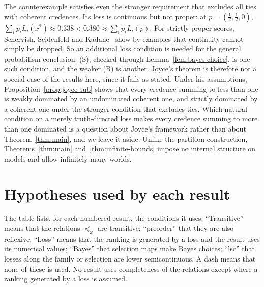 \documentclass[11pt]{article}
\theoremstyle{definition}
\theoremstyle{remark}
\begin{document}
The counterexample satisfies even the stronger requirement that excludes all ties with coherent credences. Its loss is continuous but not proper: at $p=(\tfrac12,\tfrac12,0)$, $\sum_ip_iL_i(x^*)\approx0.338<0.380\approx\sum_ip_iL_i(p)$. For strictly proper scores, Schervish, Seidenfeld and Kadane~\cite{SSK09} show by examples that continuity cannot simply be dropped. So an additional loss condition is needed for the general probabilism conclusion; (S), checked through Lemma~\ref{lem:bayes-choice}, is one such condition, and the weaker (B) is another. Joyce's theorem is therefore not a special case of the results here, since it fails as stated. Under his assumptions, Proposition~\ref{prop:joyce-sub} shows that every credence summing to less than one is weakly dominated by an undominated coherent one, and strictly dominated by a coherent one under the stronger condition that excludes ties. Which natural condition on a merely truth-directed loss makes every credence summing to more than one dominated is a question about Joyce's framework rather than about Theorem~\ref{thm:main}, and we leave it aside. Unlike the partition construction, Theorems~\ref{thm:main} and~\ref{thm:infinite-bounds} impose no internal structure on models and allow infinitely many worlds.


\section{Hypotheses used by each result}\label{sec:hypotheses}
The table lists, for each numbered result, the conditions it uses. ``Transitive'' means that the relations $\preceq_\omega$ are transitive; ``preorder'' that they are also reflexive. ``Loss'' means that the ranking is generated by a loss and the result uses its numerical values; ``Bayes'' that selection maps make Bayes choices; ``lsc'' that losses along the family or selection are lower semicontinuous. A dash means that none of these is used. No result uses completeness of the relations except where a ranking generated by a loss is assumed.
\end{document}
